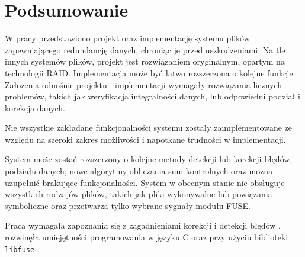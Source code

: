 \chapter{Podsumowanie}
\thispagestyle{chapterBeginStyle}

W pracy przedstawiono projekt oraz implementację systemu plików zapewniającego redundancję danych, chroniąc je przed uszkodzeniami. Na tle innych systemów plików, projekt jest rozwiązaniem oryginalnym, opartym na technologii RAID. Implementacja może być łatwo rozszerzona o kolejne funkcje. Założenia odnośnie projektu i implementacji wymagały rozwiązania licznych problemów, takich jak weryfikacja integralności danych, lub odpowiedni  podział i korekcja danych.

Nie wszystkie zakładane funkcjonalności systemu zostały zaimplementowane ze względu na szeroki zakres możliwości i napotkane trudności w implementacji.

System może zostać rozszerzony o kolejne metody detekcji lub korekcji błędów, podziału danych, nowe algorytmy obliczania sum kontrolnych oraz można uzupełnić brakujące funkcjonalności. System w obecnym stanie nie obsługuje wszystkich rodzajów plików, takich jak pliki wykonywalne lub powiązania symboliczne oraz przetwarza tylko wybrane sygnały modułu FUSE.

Praca wymagała zapoznania się z zagadnieniami korekcji i detekcji błędów \cite{Coding}, rozwinęła umiejętności programowania w języku C \cite{MAN} oraz przy użyciu biblioteki \verb|libfuse| \cite{FUSE_Docs}.
